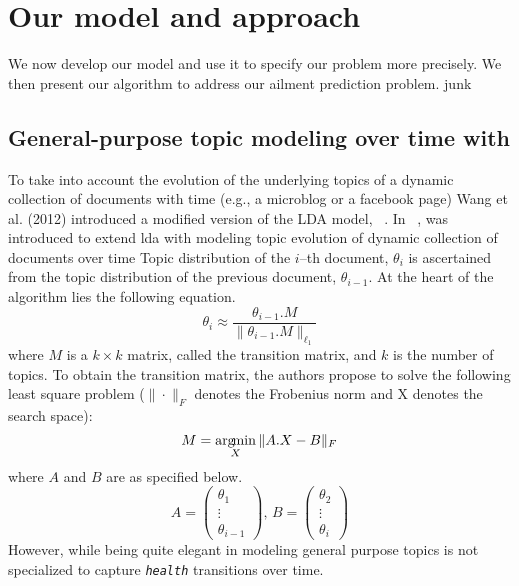 \section{Our model and approach}
\label{sec:approach}
We now develop our model and use it to specify our problem more
precisely. We then present our algorithm to address our ailment
prediction problem. junk

\subsection{General-purpose topic modeling over time with \tmlda}
To take into account the evolution of the underlying topics of a
dynamic collection of documents with time (e.g., a microblog or a
facebook page) Wang et al. (2012) introduced a modified version of the
LDA model, \tmlda~\cite{DBLP:conf/kdd/WangAB12}.
In ~\cite{DBLP:conf/kdd/WangAB12}, \tmlda was introduced to extend
lda with modeling topic evolution of dynamic collection of documents over time
 Topic distribution
of the $i$--th document, $\theta_i$  is ascertained from 
the topic distribution of the previous document, $\theta_{i-1}$.
At the heart of the algorithm lies the following equation.
\begin{equation}
	\label{eq:tmlda:basic}
	\theta_{i}\approx\frac{\theta_{i-1}.M}{\|\theta_{i-1}.M\|_{\ell_1}}
\end{equation}
where $M$ is a $k\times k$ matrix, called the transition
matrix, and $k$ is the number of topics. To obtain the transition matrix, 
the authors propose to solve the following least square
problem ($\|\cdot\|_F$ denotes the Frobenius norm and X denotes the search space):
\begin{equation}
	\label{eq:tmlda:train}
	M=\operatorname*{arg\!min}_X{\|A.X-B\|_F}
\end{equation}
where $A$ and $B$ are as specified below.
\begin{equation}
	\label{eq:tmlda:vectors}
	A=\begin{pmatrix}\theta_{1}\\\vdots\\\theta_{i-1}\end{pmatrix},\,B=\begin{pmatrix}\theta_{2}\\\vdots\\\theta_{i}\end{pmatrix}
\end{equation}
However, while being quite elegant in modeling general purpose topics
\tmlda is not specialized to capture \texttt{\emph{health}} transitions
over time.
